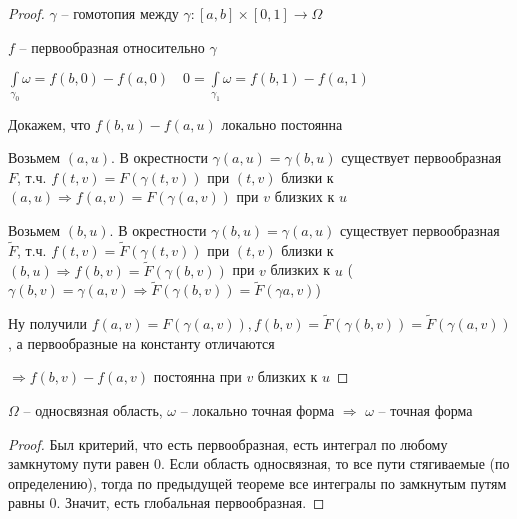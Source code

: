 \begin{proof}\thmslashn
	
	$\gamma$ -- гомотопия между $\gamma : [a, b]\times [0, 1] \to \Omega$
	
	$f$ -- первообразная относительно $\gamma$ 
	
	$\int\limits_{\gamma_0} \omega = f(b, 0) - f(a, 0) \quad 0 =  \int\limits_{\gamma_1} \omega = f(b, 1) - f(a, 1)$
	
	Докажем, что $f(b, u) - f(a, u)$ локально постоянна
	
	Возьмем $(a, u)$. В окрестности $\gamma(a, u) = \gamma(b, u)$ существует первообразная $F$, т.ч. $f(t, v) = F(\gamma(t, v))$ при $(t, v)$ близки к $(a, u) \Rightarrow f(a,v) = F(\gamma(a, v))$ при $v$ близких к $u$ 
	
    Возьмем $(b, u)$. В окрестности $\gamma(b, u) = \gamma(a, u)$ существует первообразная $\tilde{F}$, т.ч. $f(t, v) = \tilde{F}(\gamma(t, v))$ при $(t, v)$ близки к $(b, u) \Rightarrow f(b,v) = \tilde{F}(\gamma(b, v))$ при $v$ близких к $u$ ($\gamma(b, v) = \gamma(a, v) \Rightarrow \tilde{F}(\gamma(b, v)) = \tilde{F}(\gamma{a,v})$)

    Ну получили $f(a, v) = F(\gamma(a, v)), f(b, v) = \tilde{F}(\gamma(b, v)) = \tilde{F}(\gamma(a, v))$, а первообразные на константу отличаются
	
	$\Rightarrow f(b, v) - f(a, v)$ постоянна при $v$ близких к $u$
	
\end{proof}

\begin{theorem}\thmslashn
	
	$\Omega$ -- односвязная область, $\omega$ -- локально точная форма $\Rightarrow$ $\omega$ -- точная форма	
\end{theorem}


\begin{proof}\thmslashn
    Был критерий, что есть первообразная, есть интеграл по любому замкнутому пути равен 0. Если область односвязная, то все пути стягиваемые (по определению), тогда по предыдущей теореме все интегралы по замкнутым путям равны 0. Значит, есть глобальная первообразная.
\end{proof}